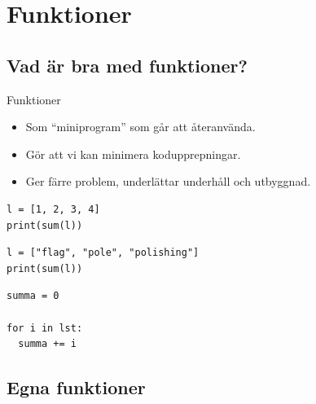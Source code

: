 \mode*

\section{Funktioner}

\subsection{Vad är bra med funktioner?}

\begin{frame}[fragile]
  \begin{block}{Funktioner}
    \begin{itemize}
      \item Som \enquote{miniprogram} som går att återanvända.
      \item Gör att vi kan minimera kodupprepningar.
      \item Ger färre problem, underlättar underhåll och utbyggnad.
    \end{itemize}
  \end{block}
\end{frame}

\begin{frame}[fragile]
  \begin{example}[Summera]
    \begin{verbatim}
l = [1, 2, 3, 4]
print(sum(l))
    \end{verbatim}
  \end{example}

  \begin{example}[Konkatenera]
    \begin{verbatim}
l = ["flag", "pole", "polishing"]
print(sum(l))
    \end{verbatim}
  \end{example}
\end{frame}

\begin{frame}[fragile]
  \begin{example}
    \begin{verbatim}
summa = 0

for i in lst:
  summa += i
    \end{verbatim}
  \end{example}
\end{frame}


\subsection{Egna funktioner}

